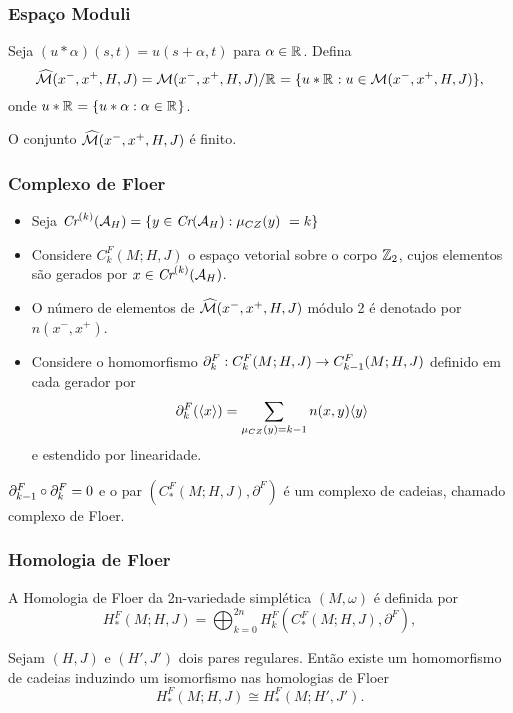 \documentclass{beamer}
\begin{document}
\begin{footnotesize}
	\begin{frame}
		\frametitle{Espaço Moduli}
		Seja $(u*\alpha)(s,t) = u(s+\alpha,t)$ para $\alpha \in \mathbb{R}^{}$.  Defina
		$$
		\widehat{\mathcal{M}}(x^{-}, x^{+}, H, J) = \mathcal{M}(x^{-},x^{+}, H, J)/\mathbb{R}^{}=\{u*\mathbb{R}^{}: u\in \mathcal{M}(x^{-},x^{+}, H, J)\},
		$$ 
		onde $u*\mathbb{R}^{} = \{u*\alpha:\alpha \in \mathbb{R}^{}\}$.
		
		\begin{teorema}
			O conjunto $\widehat{\mathcal{M}}(x^{-}, x^{+}, H, J)$ é finito.
		\end{teorema}
	\end{frame}
	
	\begin{frame}
		\frametitle{Complexo de Floer}
				
			\begin{itemize}
				\item Seja $
				\textit{Cr}^{(k)}(\mathcal{A}_{H}) = \{ y \in \textit{Cr}(\mathcal{A}_{H}): \mu_{CZ}(y) \ =	 k\}$
				
				\item Considere  $C^{F}_{k}(M;H,J)$ o espaço vetorial sobre o corpo $\mathbb{Z}_{2}$, cujos elementos são gerados por $x \in \textit{Cr}^{(k)}(\mathcal{A}_{H}) $.
				
				\item O número de elementos de $\widehat{\mathcal{M}}(x^{-}, x^{+}, H, J)$ módulo 2 é denotado por $n(x^{-},x^{+})$.
				
				\item 
				Considere o homomorfismo $\partial_{k}^{F}: C^{F}_{k}(M;H,J)\to C^{F}_{k-1}(M;H,J)$ definido em cada gerador por
				$$
				\partial_{k}^{F}(\langle x\rangle) = \sum_{\mu_{CZ}(y)=k-1}n(x,y)\langle y\rangle
				$$
				e estendido por linearidade. 
				
			\end{itemize}
		
		\begin{teorema}
			 $\partial_{k-1}^{F}\circ\partial_{k}^{F} = 0$ e o par $(C^{F}_{*}(M;H,J), \partial^{F})$ é um complexo de cadeias, chamado complexo de Floer.
		\end{teorema}
	\end{frame}
	
		\begin{frame}
		\frametitle{Homologia de Floer}
			A Homologia de Floer da 2n-variedade simplética $(M,\omega)$ é definida por 
			$$
			H^{F}_{*}(M;H,J)=\bigoplus_{k=0}^{2n}H^{F}_{k}(C^{F}_{*}(M;H,J), \partial^{F}),
			$$
			
			\begin{teorema}
				Sejam $(H,J)$ e $(H',J')$ dois pares regulares. Então existe um homomorfismo de cadeias induzindo um isomorfismo nas homologias de Floer
				$$
				H^{F}_{*}(M;H,J) \cong 	H^{F}_{*}(M;H',J'). 
				$$
			\end{teorema}
			

\end{frame}
\end{footnotesize}
\end{document}
